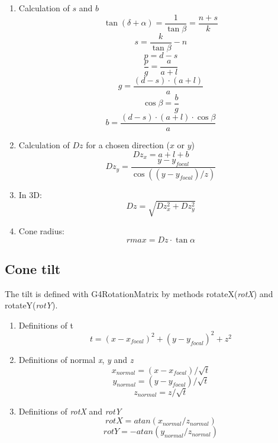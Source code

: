 \documentclass[12pt]{article}
\begin{document}
\begin{enumerate}
\item Calculation of $s$ and $b$ 
	$$\tan(\delta+\alpha)=\frac{1}{\tan{\beta}} =\frac{n+s}{k}$$
	  \begin{equation} 	
	\boxed{s=\frac{k}{\tan{\beta}}-n}
	\end{equation}
	$$p=d-s$$
	$$\frac{p}{g}=\frac{a}{a+l}$$
	$$g=\frac{(d-s)\cdot(a+l)}{a}$$ 
	$$\cos\beta=\frac{b}{g}$$
	  \begin{equation} 	
	\boxed{b=\frac{(d-s)\cdot(a+l)\cdot\cos\beta}{a}}
	\end{equation}
\item Calculation of $Dz$ for a chosen direction ($x$ or $y$)
\begin{equation} 
	\boxed{Dz_x=a+l+b}			
\end{equation}
\begin{equation} 
	\boxed{Dz_y=\frac{y-y_{focal}}{\cos{((y-y_{focal})/z)} }}			
\end{equation}	
\item In 3D: 
\begin{equation} 
	\boxed{Dz=\sqrt{Dz_{x}^{2}+Dz_{y}^{2}}}		
\end{equation}

\item Cone radius: 
\begin{equation} 
	\boxed{rmax=Dz\cdot\tan{\alpha}}			
\end{equation}
	
\end{enumerate}



\subsection{Cone tilt}

The tilt is defined with G4RotationMatrix by methods rotateX(\textit{rotX}) and rotateY(\textit{rotY}).

\begin{enumerate}
\item Definitions of t
	\begin{equation} 
	t=(x-x_{focal})^2+(y-y_{focal})^2+z^2		
	\end{equation}
\item Definitions of normal \textit{x}, \textit{y} and \textit{z}
	\begin{equation} 
	x_{normal}=(x-x_{focal})/\sqrt{t}		
	\end{equation}
	\begin{equation} 
	y_{normal}=(y-y_{focal})/\sqrt{t}			
	\end{equation}
	\begin{equation} 
	z_{normal}=z/\sqrt{t}		
	\end{equation}

\item Definitions of \textit{rotX} and \textit{rotY}
	\begin{equation} 
	\boxed{rotX=atan(x_{normal}/z_{normal})}	
	\end{equation}
	\begin{equation} 
	\boxed{rotY=-atan(y_{normal}/z_{normal})}	
	\end{equation}
 \end{enumerate}
 
\end{document}
